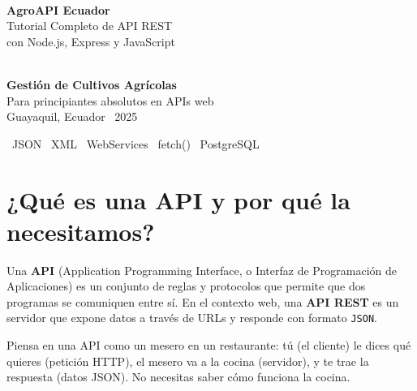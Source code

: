 \documentclass[12pt, a4paper]{article}
\begin{document}
\begin{titlepage}
  \pagecolor{verdeAgro}
  \color{white}
  \vspace*{3cm}
  \begin{center}
    {\fontsize{48}{52}\selectfont \bfseries \faLeaf}\\[1em]
    {\fontsize{28}{32}\selectfont \bfseries AgroAPI Ecuador}\\[0.5em]
    {\Large Tutorial Completo de API REST}\\[0.4em]
    {\large con Node.js, Express y JavaScript}\\[3cm]
    \\[1cm]
    {\large \textbf{Gestión de Cultivos Agrícolas}}\\[0.5em]
    {\normalsize Para principiantes absolutos en APIs web}\\[3cm]
    {\small Guayaquil, Ecuador \textbullet\ 2025}
  \end{center}
  \vfill
  \begin{center}
    {\small \faCode\ JSON \textbullet\ XML \textbullet\ WebServices \textbullet\ fetch() \textbullet\ PostgreSQL}
  \end{center}
\end{titlepage}
\pagecolor{white}\color{grisOscuro}

\tableofcontents
\newpage

\section{¿Qué es una API y por qué la necesitamos?}

Una \textbf{API} (Application Programming Interface, o Interfaz de Programación de Aplicaciones) es un conjunto de reglas y protocolos que permite que dos programas se comuniquen entre sí. En el contexto web, una \textbf{API REST} es un servidor que expone datos a través de URLs y responde con formato \texttt{JSON}.

\begin{tcolorbox}[notaStyle]
  Piensa en una API como un mesero en un restaurante: tú (el cliente) le dices qué quieres (petición HTTP), el mesero va a la cocina (servidor), y te trae la respuesta (datos JSON). No necesitas saber cómo funciona la cocina.
\end{tcolorbox}
\end{document}
